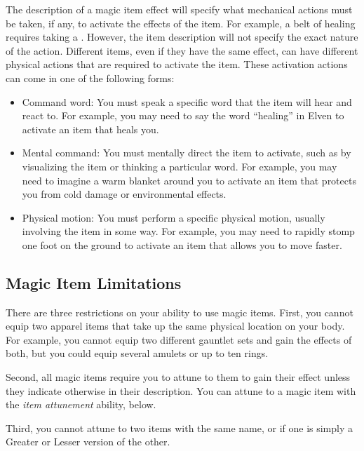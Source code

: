         The description of a magic item effect will specify what mechanical actions must be taken, if any, to activate the effects of the item.
        For example, a belt of healing requires taking a .
        However, the item description will not specify the exact nature of the action.
        Different items, even if they have the same effect, can have different physical actions that are required to activate the item.
        These activation actions can come in one of the following forms:
        \begin{itemize}
           \item Command word: You must speak a specific word that the item will hear and react to.
                For example, you may need to say the word ``healing'' in Elven to activate an item that heals you.
            \item Mental command: You must mentally direct the item to activate, such as by visualizing the item or thinking a particular word.
                For example, you may need to imagine a warm blanket around you to activate an item that protects you from cold damage or environmental effects.
            \item Physical motion: You must perform a specific physical motion, usually involving the item in some way.
                For example, you may need to rapidly stomp one foot on the ground to activate an item that allows you to move faster.
        \end{itemize}


    \subsection{Magic Item Limitations}

        There are three restrictions on your ability to use magic items.
        First, you cannot equip two apparel items that take up the same physical location on your body.
        For example, you cannot equip two different gauntlet sets and gain the effects of both, but you could equip several amulets or up to ten rings.

        Second, all magic items require you to attune to them to gain their effect unless they indicate otherwise in their description.
        You can attune to a magic item with the \textit{item attunement} ability, below.

        Third, you cannot attune to two items with the same name, or if one is simply a Greater or Lesser version of the other.


